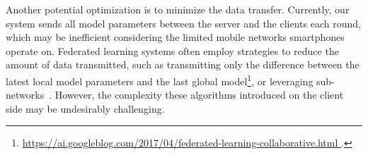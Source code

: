 Another potential optimization is to minimize the data transfer. Currently,
our system sends all model parameters between the server and the clients each
round,
which may be inefficient considering the limited mobile networks smartphones
operate on.
Federated learning systems often employ strategies to reduce the amount of data
transmitted,
such as transmitting only the difference between the latest local model
parameters and the last global model\footnote{\url{
    https://ai.googleblog.com/2017/04/federated-learning-collaborative.html
}.}, or leveraging sub-networks~\cite{li2021hermes}.
However,
the complexity these algorithms introduced on the client side may be undesirably
challenging.
